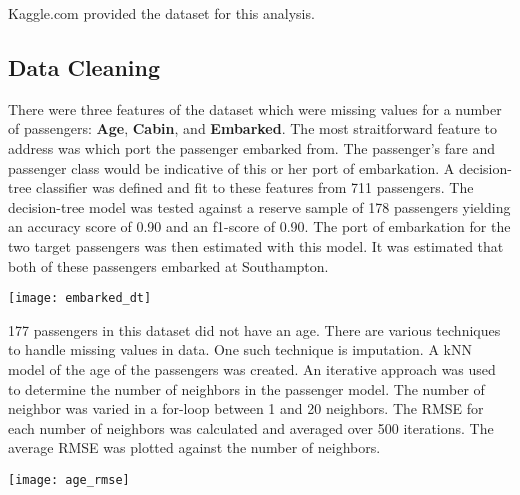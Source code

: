 \documentclass[10pt]{article}
\begin{document}
\begin{multicols}{2}
	Kaggle.com provided the dataset for this analysis.

\subsection{Data Cleaning}
	

	There were three features of the dataset which were missing values for a number of passengers: \textbf{Age}, \textbf{Cabin}, and \textbf{Embarked}.
	The most straitforward feature to address was which port the passenger embarked from.
	The passenger's fare and passenger class would be indicative of this or her port of embarkation.
	A decision-tree classifier was defined and fit to these features from 711 passengers.
	The decision-tree model was tested against a reserve sample of 178 passengers yielding an accuracy score of 0.90 and an f1-score of 0.90.
	The port of embarkation for the two target passengers was then estimated with this model.
	It was estimated that both of these passengers embarked at Southampton.\\
	\begin{center}
	\texttt{[image: embarked\_dt]}\\
	\end{center}

	177 passengers in this dataset did not have an age.
	There are various techniques to handle missing values in data.
	One such technique is imputation.
	A kNN model of the age of the passengers was created.
	An iterative approach was used to determine the number of neighbors in the passenger model.
	The number of neighbor was varied in a for-loop between 1 and 20 neighbors.
	The RMSE for each number of neighbors was calculated and averaged over 500 iterations.
	The average RMSE was plotted against the number of neighbors.
	\begin{center}	
	\texttt{[image: age\_rmse]}\\
	\end{center}


\end{multicols}
\end{document}
